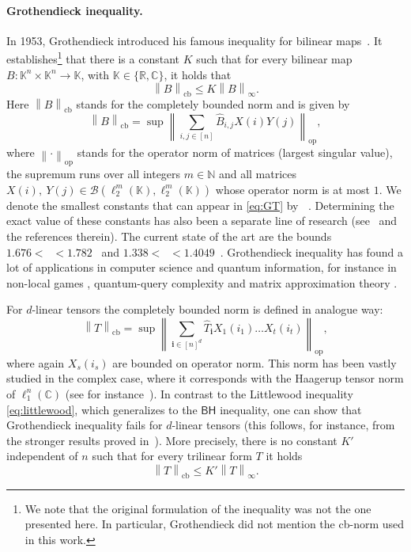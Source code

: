 \documentclass[11pt]{article}
\newcommand{\norm}[1]{\left\|{#1}\right\|}
\newcommand{\BH}{\textsf{BH}}
\theoremstyle{plain}
\DeclareMathOperator{\cb}{cb}
\renewcommand{\cb}{{\mathrm{cb}}}
\DeclareMathOperator{\GK}{G_{\mathbb K}}
\DeclareMathOperator{\GR}{G_{\mathbb R}}
\DeclareMathOperator{\GC}{G_{\mathbb C}}
\DeclareMathOperator{\op}{op}
\newcommand{\ind}[1]{\mathbf{#1}}
\theoremstyle{plain}
\theoremstyle{definition}
\theoremstyle{remark}
\theoremstyle{named}
\begin{document}
\paragraph{Grothendieck inequality.} 
In 1953, Grothendieck introduced his famous inequality for bilinear maps~\cite{grothendieck1953resume}. It establishes\footnote{We note that the original formulation of the inequality was not the one presented here. In particular, Grothendieck did not mention the cb-norm used in this work.} that there is a constant $K$ such that for every bilinear map $B:\mathbb K^n\times\mathbb K^n\to \mathbb K$, with $\mathbb K\in \{\mathbb R,\mathbb C\}$, it holds that 
\begin{equation}\label{eq:GT}
    \norm{B}_{\cb}\leq K \norm{B}_{\infty}.
\end{equation}
Here $\norm{B}_\cb$ stands for the completely bounded norm and is given by
$$
\norm{B}_{\cb}=\sup\norm{\sum_{i,j\in [n]}\widehat B_{i,j} X(i)Y(j)}_{\op},
$$
where $\norm{\cdot}_{\op}$ stands for the operator norm of matrices (largest singular value), the supremum runs over all integers $m\in\mathbb N$ and all matrices $X(i),\ Y(j)\in \mathcal{B}(\ell_2^m(\mathbb K),\ell_2^m(\mathbb K))$ whose operator norm is at most $1$. We denote the smallest constants that can appear in \eqref{eq:GT} by $\GK$. Determining the exact value of these constants has also been a separate line of research (see~\cite[Section 4]{pisier2012grothendieck} and the references therein). The current state of the art are the bounds $1.676 <\GR<1.782$~\cite{Davie:1984, Reeds:1991, Braverman:2013} and $1.338<\GC<1.4049$~\cite{haagerup1987new,davie2006matrix}. Grothendieck inequality has found a lot of applications in computer science and quantum information, for instance in non-local games \cite{Tsirelson}, quantum-query complexity \cite{Aaronson2015PolynomialsQQ} and matrix approximation theory \cite{alon2004approximating}.

For $d$-linear tensors the completely bounded norm is defined in analogue way: 
\begin{equation}\label{eq:Tcb}
    \norm{T}_{\cb}=\sup\norm{\sum_{\ind i\in [n]^d}\widehat T_{\ind i} X_1(i_1)\dots X_t(i_t)}_{\op},
\end{equation}
where again $X_s(i_s)$ are bounded on operator norm. This norm has been vastly studied in the complex case, where it corresponds with the Haagerup tensor norm of $\ell_1^n(\mathbb C)$ (see for instance~\cite[Chapter 17]{paulsenoperatoralgebras}). In contrast to the Littlewood inequality \eqref{eq:littlewood}, which generalizes to the $\BH$ inequality, one can show that Grothendieck inequality fails for $d$-linear tensors (this follows, for instance, from the stronger results proved in~\cite{perez2008unbounded}). More precisely, there is no constant $K'$ independent of $n$ such that for every trilinear form $T$ it holds $$\norm{T}_{\cb}\leq K'\norm{T}_{\infty}.$$
\end{document}
